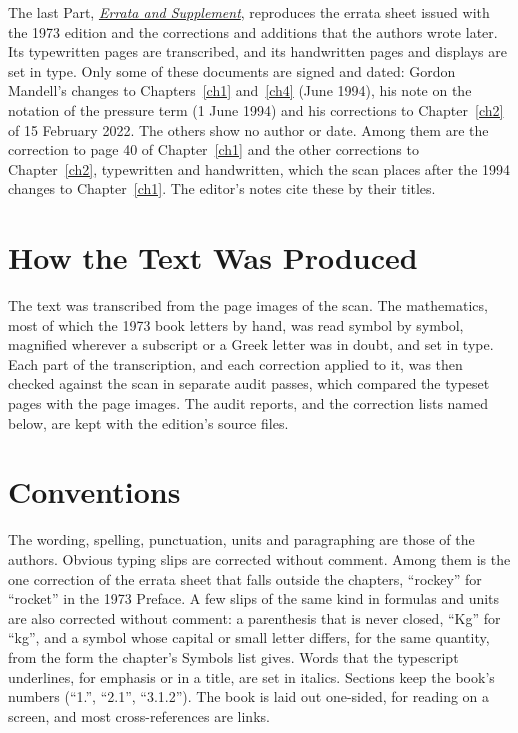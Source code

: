 The last Part, \hyperref[supp]{\emph{Errata and Supplement}}, reproduces the errata sheet issued
with the 1973 edition and the corrections and additions that the authors wrote later. Its
typewritten pages are transcribed, and its handwritten pages and displays are set in type. Only
some of these documents are signed and dated: Gordon Mandell's changes to Chapters~\ref{ch1}
and~\ref{ch4} (June 1994), his note on the notation of the pressure term (1 June 1994) and his
corrections to Chapter~\ref{ch2} of 15 February 2022. The others show no author or date. Among
them are the correction to page 40 of Chapter~\ref{ch1} and the other corrections to
Chapter~\ref{ch2}, typewritten and handwritten, which the scan places after the 1994 changes to
Chapter~\ref{ch1}. The editor's notes cite these by their titles.

\section*{How the Text Was Produced}

The text was transcribed from the page images of the scan. The mathematics, most of which the 1973
book letters by hand, was read symbol by symbol, magnified wherever a subscript or a Greek letter
was in doubt, and set in type. Each part of the transcription, and each correction applied to it,
was then checked against the scan in separate audit passes, which compared the typeset pages with
the page images. The audit reports, and the correction lists named below, are kept with the
edition's source files.

\section*{Conventions}

The wording, spelling, punctuation, units and paragraphing are those of the authors. Obvious typing
slips are corrected without comment. Among them is the one correction of the errata sheet that falls
outside the chapters, ``rockey'' for ``rocket'' in the 1973 Preface. A few slips of the
same kind in formulas and units are also corrected without comment: a parenthesis that is never
closed, ``Kg'' for ``kg'', and a symbol whose capital or small letter differs, for the same
quantity, from the form the chapter's Symbols list gives. Words that the typescript underlines, for
emphasis or in a title, are set in italics. Sections keep the book's numbers (``1.'', ``2.1'',
``3.1.2''). The book is laid out one-sided, for reading on a screen, and most cross-references are
links.

